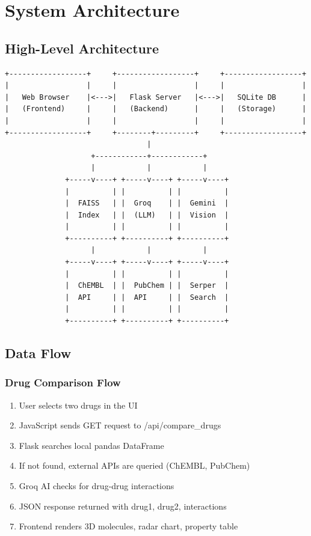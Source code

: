 \documentclass[12pt,a4paper]{report}
\begin{document}
\newpage

\chapter{System Architecture}

\section{High-Level Architecture}

\begin{verbatim}
+------------------+     +------------------+     +------------------+
|                  |     |                  |     |                  |
|   Web Browser    |<--->|   Flask Server   |<--->|   SQLite DB      |
|   (Frontend)     |     |   (Backend)      |     |   (Storage)      |
|                  |     |                  |     |                  |
+------------------+     +--------+---------+     +------------------+
                                 |
                    +------------+------------+
                    |            |            |
              +-----v----+ +-----v----+ +-----v----+
              |          | |          | |          |
              |  FAISS   | |  Groq    | |  Gemini  |
              |  Index   | |  (LLM)   | |  Vision  |
              |          | |          | |          |
              +----------+ +----------+ +----------+
                    |            |            |
              +-----v----+ +-----v----+ +-----v----+
              |          | |          | |          |
              |  ChEMBL  | |  PubChem | |  Serper  |
              |  API     | |  API     | |  Search  |
              |          | |          | |          |
              +----------+ +----------+ +----------+
\end{verbatim}

\section{Data Flow}

\subsection{Drug Comparison Flow}
\begin{enumerate}
    \item User selects two drugs in the UI
    \item JavaScript sends GET request to /api/compare\_drugs
    \item Flask searches local pandas DataFrame
    \item If not found, external APIs are queried (ChEMBL, PubChem)
    \item Groq AI checks for drug-drug interactions
    \item JSON response returned with drug1, drug2, interactions
    \item Frontend renders 3D molecules, radar chart, property table
\end{enumerate}
\end{document}
